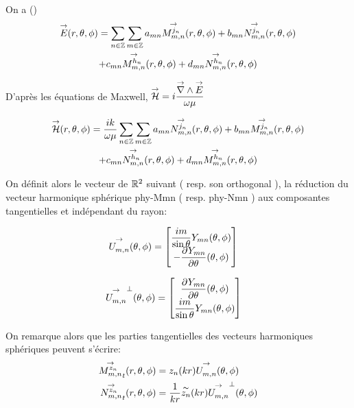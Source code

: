         On a (\cite{cheng_spectral_1993})
        \begin{multline}
            \vE(\rtp) = \sum_{n\in\ZZ}\sum_{m\in\ZZ} a_{mn} \Mmn[j_n](\rtp) + b_{mn} \Nmn[j_n](\rtp)
            \\
            + c_{mn} \Mmn[h_n](\rtp) + d_{mn} \Nmn[h_n](\rtp)
        \end{multline}

        D'après les équations de Maxwell, \(\vH = i\frac{\vrot \vE}{\w\mu}\)

        \begin{multline}
            \vH(\rtp) = \frac{ik}{\w\mu}\sum_{n\in\ZZ}\sum_{m\in\ZZ} a_{mn} \Nmn[j_n](\rtp) + b_{mn} \Mmn[j_n](\rtp)
            \\
            + c_{mn} \Nmn[h_n](\rtp) + d_{mn} \Mmn[h_n](\rtp)
        \end{multline}

        On définit alors le vecteur de \(\RR^2\) suivant ( resp. son orthogonal ), la réduction du vecteur harmonique sphérique \gls{phy-Mmn} ( resp. \gls{phy-Nmn} ) aux composantes tangentielles et indépendant du rayon:

        \begin{align}
            \label{eq:defUmn_tgt}
            \Umn(\tp) &=
            \begin{bmatrix}
                \frac{im}{\sin\theta}Y_{mn}(\tp)
                \\
                - \ddr{\theta}{Y_{mn}}(\tp)
            \end{bmatrix}
        \end{align}

        \begin{align}
        \label{eq:defNmn_tgt}
          \Umn^\perp(\tp) &=
          \begin{bmatrix}
            \ddr{\theta}{Y_{mn}}(\tp)
            \\
            \frac{im}{\sin\theta}Y_{mn}(\tp)
          \end{bmatrix}
        \end{align}


        On remarque alors que les parties tangentielles des vecteurs harmoniques sphériques peuvent s'écrire:
        \begin{align}
          \Mmn[z_n]_t(\rtp) &= z_n(kr)\Umn(\tp)
          \\
          \Nmn[z_n]_t(\rtp) &= \frac{1}{kr}\tilde{z_n}(kr)\Umn^\perp(\tp)
        \end{align}

